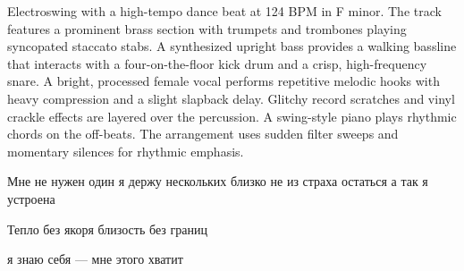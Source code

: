 
\begin{notes}
\end{notes}
\begin{style}
Electroswing with a high-tempo dance beat at 124 BPM in F minor. The track features a prominent brass section with trumpets and trombones playing syncopated staccato stabs. A synthesized upright bass provides a walking bassline that interacts with a four-on-the-floor kick drum and a crisp, high-frequency snare. A bright, processed female vocal performs repetitive melodic hooks with heavy compression and a slight slapback delay. Glitchy record scratches and vinyl crackle effects are layered over the percussion. A swing-style piano plays rhythmic chords on the off-beats. The arrangement uses sudden filter sweeps and momentary silences for rhythmic emphasis.
\end{style}
\begin{lyrics}
Мне не нужен один
я держу нескольких близко
не из страха остаться
а так я устроена


Тепло без якоря
близость без границ

я знаю себя —
мне этого хватит
\end{lyrics}

